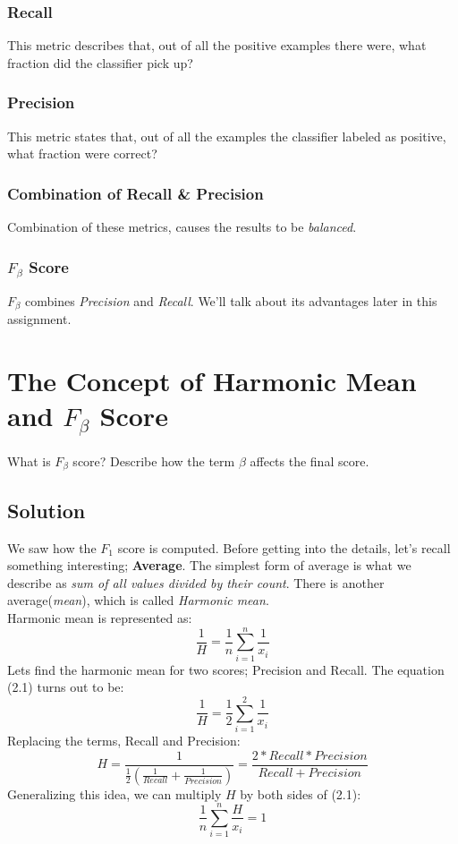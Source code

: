 \documentclass[12pt]{article}
\numberwithin{equation}{section}
\numberwithin{table}{section}
\numberwithin{figure}{section}
\begin{document}
\subsubsection*{Recall}
This metric describes that, out of all the positive examples there were, what fraction did the classifier pick up?

\subsubsection*{Precision}
This metric states that, out of all the examples the classifier labeled as positive, what fraction were correct?

\subsubsection*{Combination of Recall \& Precision}
Combination of these metrics, causes the results to be \textit{balanced}.

\subsubsection*{$F_{\beta}$ Score}
$F_{\beta}$ combines \textit{Precision} and \textit{Recall}. We'll talk about its advantages later in this assignment.
\newpage

\section{The Concept of Harmonic Mean and $F_{\beta}$ Score}
What is $F_{\beta}$ score? Describe how the term $\beta$ affects the final score.
\subsection*{Solution}
We saw how the $F_1$ score is computed. Before getting into the details, let's recall something interesting; \textbf{Average}.
The simplest form of average is what we describe as \textit{sum of all values divided by their count}. There is another average(\textit{mean}), which is called \textit{Harmonic mean}.\\
 Harmonic mean is represented as:
\begin{equation}
	\frac{1}{H}	= \frac{1}{n}\sum_{i=1}^{n}\frac{1}{x_{i}}
\end{equation}
Lets find the harmonic mean for two scores; Precision and Recall. The equation (2.1) turns out to be:
$$
	\frac{1}{H}	= \frac{1}{2}\sum_{i=1}^{2}\frac{1}{x_{i}}
$$	
Replacing the terms, Recall and Precision:
\begin{equation}
H = \frac{1}{\frac{1}{2}(\frac{1}{Recall} + \frac{1}{Precision})} =  \frac{2*Recall*Precision}{Recall + Precision}
\end{equation}
Generalizing this idea, we can multiply $H$ by both sides of (2.1):
\begin{equation}
	\frac{1}{n}\sum_{i=1}^{n}\frac{H}{x_i} = 1
\end{equation}
\end{document}
